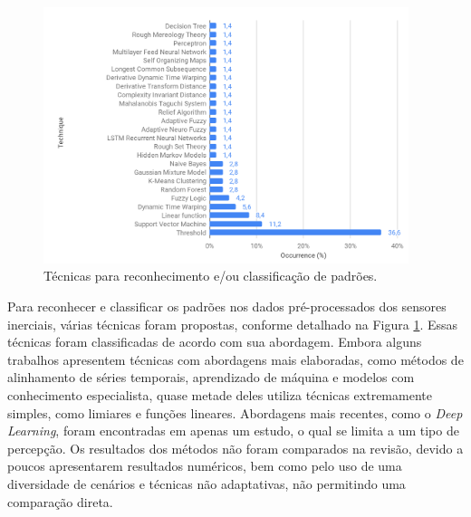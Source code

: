 \begin{figure}[h!]
  \centering
  \caption{Técnicas para reconhecimento e/ou classificação de padrões.}
   \label{fig:techniques_occurrence}
   \includegraphics[width=0.95\textwidth]{figuras/fig3_3.png}
\end{figure}

Para reconhecer e classificar os padrões nos dados pré-processados dos sensores inerciais, várias técnicas foram propostas, conforme detalhado na Figura \ref{fig:techniques_occurrence}. Essas técnicas foram classificadas de acordo com sua abordagem.  Embora alguns trabalhos apresentem técnicas com abordagens mais elaboradas, como métodos de alinhamento de séries temporais, aprendizado de máquina e modelos com conhecimento especialista, quase metade deles utiliza técnicas extremamente simples, como limiares e funções lineares. Abordagens mais recentes, como o \textit{Deep Learning}, foram encontradas em apenas um estudo, o qual se limita a um tipo de percepção. Os resultados dos métodos não foram comparados na revisão, devido a poucos apresentarem resultados numéricos, bem como pelo uso de uma diversidade de cenários e técnicas não adaptativas, não permitindo uma comparação direta.

